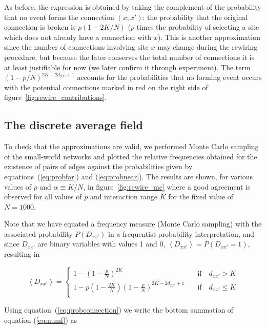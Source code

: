 \noindent As before, the expression is obtained by taking the complement of the probability that no event forms the connection
$(x,x')$: the probability that the original connection is broken is $p(1-2K/N)$ ($p$ times the probability of selecting a site which
does not already have a connection with $x$). This is another approximation since the number of connections involving site $x$ may
change during the rewiring procedure, but because the later conserves the total number of connections it is at least justifiable for
now (we later confirm it through experiment). The term $(1-p/N)^{2K-2d_{xx'}+1}$ accounts for the probabilities that no forming event
occurs with the potential connections marked in {\color{red}red} on the right side of figure~\ref{fig:rewire_contributions}.

\subsection{The discrete average field}

To check that the approximations are valid, we performed Monte Carlo sampling of the small-world networks and plotted the relative
frequencies obtained for the existence of pairs of edges against the probabilities given by equations~(\ref{eq:probfar}) and
(\ref{eq:probnear}). The results are shown, for various values of $p$ and $\alpha \equiv K/N$, in figure~\ref{fig:rewire_mc} where a
good agreement is observed for all values of $p$ and interaction range $K$ for the fixed value of $N=1000$.

Note that we have equated a frequency measure (Monte Carlo sampling) with the associated probability $P(D_{xx'})$ in a frequentist
probability interpretation, and since $D_{xx'}$ are binary variables with values 1 and 0, $\left<D_{xx'}\right> = P(D_{xx'}=1)$,
resulting in

\begin{equation}
    \left<D_{xx'}\right> =
    \begin{cases}
        1-\left( 1 - \frac{p}{N} \right)^{2K} \quad &\text{if} \quad d_{xx'}>K\\
        1-p\left( 1 - \frac{2K}{N} \right)\left( 1 - \frac{p}{N} \right)^{2K-2d_{xx'}+1} \quad &\text{if} \quad d_{xx'}\leq K\\
    \end{cases}
    \label{eq:probconnection}
\end{equation}

Using equation~(\ref{eq:probconnection}) we write the bottom summation of equation (\ref{eq:numf}) as

